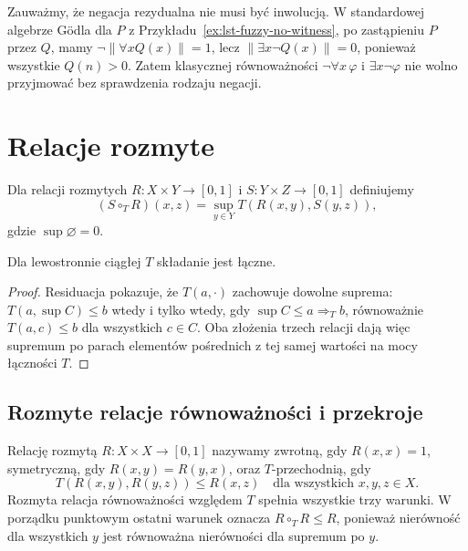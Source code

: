 Zauważmy, że negacja rezydualna nie musi być inwolucją.
W standardowej algebrze Gödla dla $P$ z
Przykładu~\ref{ex:lst-fuzzy-no-witness}, po zastąpieniu
$P$ przez $Q$, mamy $\neg\|\forall xQ(x)\|=1$,
lecz $\|\exists x\neg Q(x)\|=0$, ponieważ wszystkie $Q(n)>0$.
Zatem klasycznej równoważności
$\neg\forall x\,\varphi$ i $\exists x\neg\varphi$
nie wolno przyjmować bez sprawdzenia rodzaju negacji.

\section{Relacje rozmyte}
Dla relacji rozmytych $R:X\times Y\to[0,1]$ i
$S:Y\times Z\to[0,1]$ definiujemy
\[
(S\circ_T R)(x,z)=\sup_{y\in Y}T(R(x,y),S(y,z)),
\]
gdzie $\sup\varnothing=0$.
\begin{stwierdzenie}
Dla lewostronnie ciągłej $T$ składanie jest łączne.
\end{stwierdzenie}
\begin{proof}
Residuacja pokazuje, że $T(a,\cdot)$ zachowuje dowolne suprema:
$T(a,\sup C)\leq b$ wtedy i tylko wtedy, gdy
$\sup C\leq a\Rightarrow_T b$, równoważnie
$T(a,c)\leq b$ dla wszystkich $c\in C$.
Oba złożenia trzech relacji dają więc supremum po parach
elementów pośrednich z tej samej wartości na mocy łączności $T$.
\end{proof}

\subsection{Rozmyte relacje równoważności i przekroje}

\begin{definicja}\label{def:lst-fuzzy-equivalence}
Relację rozmytą $R:X\times X\to[0,1]$ nazywamy zwrotną,
gdy $R(x,x)=1$, symetryczną, gdy $R(x,y)=R(y,x)$,
oraz $T$-przechodnią, gdy
\[
 T(R(x,y),R(y,z))\leq R(x,z)
 \quad\text{dla wszystkich }x,y,z\in X.
\]
Rozmyta relacja równoważności względem $T$ spełnia wszystkie
trzy warunki. W porządku punktowym ostatni warunek oznacza
$R\circ_T R\leq R$, ponieważ nierówność dla wszystkich
$y$ jest równoważna nierówności dla supremum po $y$.
\end{definicja}


